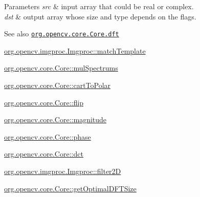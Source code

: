 \begin{DoxyParams}{Parameters}
{\em src} & input array that could be real or complex. \\
\hline
{\em dst} & output array whose size and type depends on the {\ttfamily flags}.\\
\hline
\end{DoxyParams}
\begin{DoxySeeAlso}{See also}
\href{http://docs.opencv.org/modules/core/doc/operations_on_arrays.html#dft}{\tt org.\+opencv.\+core.\+Core.\+dft} 

\mbox{\hyperlink{classorg_1_1opencv_1_1imgproc_1_1_imgproc_ab7f64647bb4d0400664056af42b90063}{org.\+opencv.\+imgproc.\+Imgproc\+::match\+Template}} 

\mbox{\hyperlink{classorg_1_1opencv_1_1core_1_1_core_a249146033929c968ef948e290c2a438c}{org.\+opencv.\+core.\+Core\+::mul\+Spectrums}} 

\mbox{\hyperlink{classorg_1_1opencv_1_1core_1_1_core_a395a53b9bd769978c12c2c19a02ffeae}{org.\+opencv.\+core.\+Core\+::cart\+To\+Polar}} 

\mbox{\hyperlink{classorg_1_1opencv_1_1core_1_1_core_a8dc68bbfca84b4fdfb9cd7bd79fc893e}{org.\+opencv.\+core.\+Core\+::flip}} 

\mbox{\hyperlink{classorg_1_1opencv_1_1core_1_1_core_ac0195922fb03d6bad195054e615cb4e1}{org.\+opencv.\+core.\+Core\+::magnitude}} 

\mbox{\hyperlink{classorg_1_1opencv_1_1core_1_1_core_a09f94d89796effb89e2bff15c54b383a}{org.\+opencv.\+core.\+Core\+::phase}} 

\mbox{\hyperlink{classorg_1_1opencv_1_1core_1_1_core_a1f0b3c28295d4db1ecd755201833d6cb}{org.\+opencv.\+core.\+Core\+::dct}} 

\mbox{\hyperlink{classorg_1_1opencv_1_1imgproc_1_1_imgproc_af8d713c4327b7458705f063ad4fa83e5}{org.\+opencv.\+imgproc.\+Imgproc\+::filter2D}} 

\mbox{\hyperlink{classorg_1_1opencv_1_1core_1_1_core_a9818ffe89dca479da8352d5bf6ebd6b3}{org.\+opencv.\+core.\+Core\+::get\+Optimal\+D\+F\+T\+Size}} 
\end{DoxySeeAlso}
\mbox{\label{classorg_1_1opencv_1_1core_1_1_core_ad0cc67e80d303076c4a8d486fe6b82c9}} 
